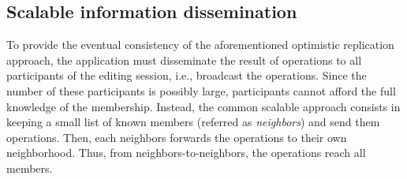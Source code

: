 


\subsection{Scalable information dissemination}

To provide the eventual consistency of the aforementioned optimistic
replication approach, the application must disseminate the result of operations
to all participants of the editing session, i.e., broadcast the
operations. Since the number of these participants is possibly large,
participants cannot afford the full knowledge of the membership. Instead, the
common scalable approach consists in keeping a small list of known members
(referred as \emph{neighbors}) and send them operations. Then, each neighbors
forwards the operations to their own neighborhood. Thus, from
neighbors-to-neighbors, the operations reach all members.

